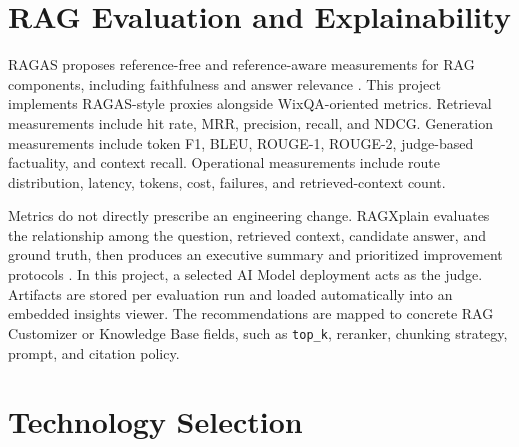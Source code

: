 \section{RAG Evaluation and Explainability}

RAGAS proposes reference-free and reference-aware measurements for RAG
components, including faithfulness and answer relevance
\cite{es2023ragas}. This project implements RAGAS-style proxies alongside
WixQA-oriented metrics. Retrieval measurements include hit rate, MRR,
precision, recall, and NDCG. Generation measurements include token F1, BLEU,
ROUGE-1, ROUGE-2, judge-based factuality, and context recall. Operational
measurements include route distribution, latency, tokens, cost, failures, and
retrieved-context count.

Metrics do not directly prescribe an engineering change. RAGXplain evaluates
the relationship among the question, retrieved context, candidate answer, and
ground truth, then produces an executive summary and prioritized improvement
protocols \cite{cohen2025ragxplain}. In this project, a selected AI Model
deployment acts as the judge. Artifacts are stored per evaluation run and
loaded automatically into an embedded insights viewer. The recommendations are
mapped to concrete RAG Customizer or Knowledge Base fields, such as
\texttt{top\_k}, reranker, chunking strategy, prompt, and citation policy.

\section{Technology Selection}

